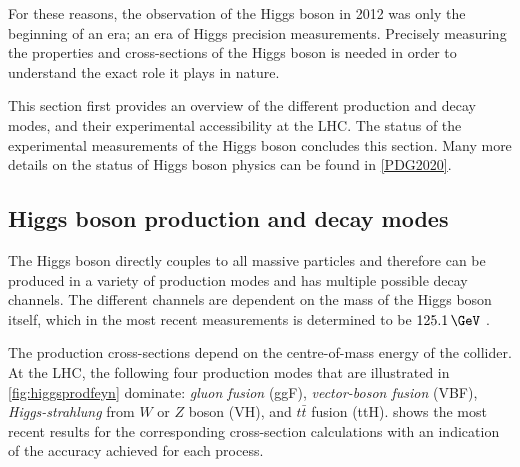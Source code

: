For these reasons, the observation of the Higgs boson in 2012 was only the beginning of an era; an era of Higgs precision measurements. Precisely measuring the properties and cross-sections of the Higgs boson is needed in order to understand the exact role it plays in nature. 

This section first provides an overview of the different production and decay modes, and their experimental accessibility at the LHC.
The status of the experimental measurements of the Higgs boson concludes this section.
Many more details on the status of Higgs boson physics can be found in \cref{PDG2020}.

\subsection{Higgs boson production and decay modes}
\label{sec:higgschannels}
The Higgs boson directly couples to all massive particles and therefore can be produced in a variety of production modes and has multiple possible decay channels.
The different channels are dependent on the mass of the Higgs boson itself, which in the most recent measurements is determined to be $125.1\,\GeV$ . 

The production cross-sections depend on the centre-of-mass energy of the collider. 
At the LHC, the following four production modes that are illustrated in \cref{fig:higgsprodfeyn} dominate: \emph{gluon fusion} (ggF), \emph{vector-boson fusion} (VBF), \emph{Higgs-strahlung} from $W$ or $Z$ boson (VH), and $t\bar{t}$ fusion (ttH).
 shows the most recent results for the corresponding cross-section calculations with an indication of the accuracy achieved for each process.

